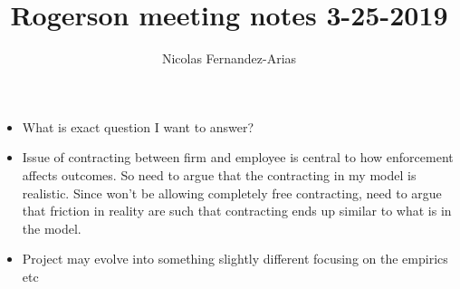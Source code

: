 \documentclass[12pt,english]{article}
\theoremstyle{remark}
\begin{document}
	
\title{Rogerson meeting notes 3-25-2019}
\author{Nicolas Fernandez-Arias}
\maketitle

\begin{itemize}
	\item What is exact question I want to answer?
	\item Issue of contracting between firm and employee is central to how enforcement affects outcomes. So need to argue that the contracting in my model is realistic. Since won't be allowing completely free contracting, need to argue that friction in reality are such that contracting ends up similar to what is in the model.
	\item Project may evolve into something slightly different focusing on the empirics etc
\end{itemize}
\end{document}
